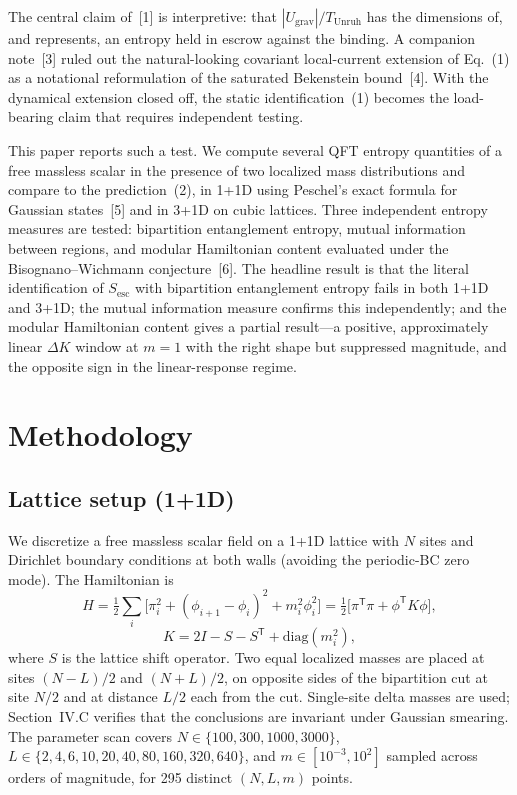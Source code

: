 \documentclass[11pt]{article}
\newcommand{\Sesc}{S_{\mathrm{esc}}}
\newcommand{\Tu}{T_{\mathrm{Unruh}}}
\begin{document}
The central claim of~[1] is interpretive: that $|U_{\mathrm{grav}}|/\Tu$ has the dimensions of, and
represents, an entropy held in escrow against the binding. A companion note~[3] ruled out the
natural-looking covariant local-current extension of Eq.~(1) as a notational reformulation of the
saturated Bekenstein bound~[4]. With the dynamical extension closed off, the static identification~(1)
becomes the load-bearing claim that requires independent testing.

This paper reports such a test. We compute several QFT entropy quantities of a free massless scalar in
the presence of two localized mass distributions and compare to the prediction~(2), in 1+1D using
Peschel's exact formula for Gaussian states~[5] and in 3+1D on cubic lattices. Three independent
entropy measures are tested: bipartition entanglement entropy, mutual information between regions, and
modular Hamiltonian content evaluated under the Bisognano--Wichmann conjecture~[6]. The headline
result is that the literal identification of $\Sesc$ with bipartition entanglement entropy fails in both
1+1D and 3+1D; the mutual information measure confirms this independently; and the modular
Hamiltonian content gives a partial result---a positive, approximately linear $\Delta K$ window at $m=1$
with the right shape but suppressed magnitude, and the opposite sign in the linear-response regime.

\section{Methodology}
\subsection{Lattice setup (1+1D)}
We discretize a free massless scalar field on a 1+1D lattice with $N$ sites and Dirichlet boundary
conditions at both walls (avoiding the periodic-BC zero mode). The Hamiltonian is
\begin{equation}
  H = \tfrac{1}{2}\sum_{i}\bigl[\pi_{i}^{2} + (\phi_{i+1} - \phi_{i})^{2} + m_{i}^{2}\phi_{i}^{2}\bigr]
  = \tfrac{1}{2}\bigl[\pi^{\mathsf{T}}\pi + \phi^{\mathsf{T}}K\phi\bigr],
\end{equation}
\begin{equation}
  K = 2I - S - S^{\mathsf{T}} + \mathrm{diag}(m_{i}^{2}),
\end{equation}
where $S$ is the lattice shift operator. Two equal localized masses are placed at sites $(N-L)/2$ and
$(N+L)/2$, on opposite sides of the bipartition cut at site $N/2$ and at distance $L/2$ each from the
cut. Single-site delta masses are used; Section~IV.C verifies that the conclusions are invariant under
Gaussian smearing. The parameter scan covers $N \in \{100, 300, 1000, 3000\}$,
$L \in \{2,4,6,10,20,40,80,160,320,640\}$, and $m \in [10^{-3}, 10^{2}]$ sampled across orders of
magnitude, for 295 distinct $(N,L,m)$ points.
\end{document}
